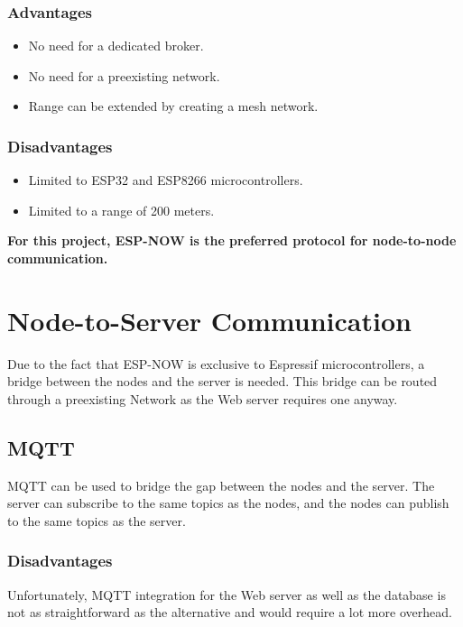         \subsubsection{Advantages}
        \begin{itemize}
            \item No need for a dedicated broker.
            \item No need for a preexisting network.
            \item Range can be extended by creating a mesh network.
        \end{itemize}

        \subsubsection{Disadvantages}
        \begin{itemize}
            \item Limited to ESP32 and ESP8266 microcontrollers.
            \item Limited to a range of 200 meters.
        \end{itemize}

    \vspace{1cm}
    \textbf{For this project, ESP-NOW is the preferred protocol for 
    node-to-node communication.}

\section{Node-to-Server Communication}
Due to the fact that ESP-NOW is exclusive to Espressif microcontrollers,
a bridge between the nodes and the server is needed. This bridge can be 
routed through a preexisting Network as the Web server requires 
one anyway.

    \subsection{MQTT}
    MQTT can be used to bridge the gap between the nodes and the server.
    The server can subscribe to the same topics as the nodes, and the nodes
    can publish to the same topics as the server.

        \subsubsection{Disadvantages}
        Unfortunately, MQTT integration for the Web server as well as the database
        is not as straightforward as the alternative and would require a lot more 
        overhead.

